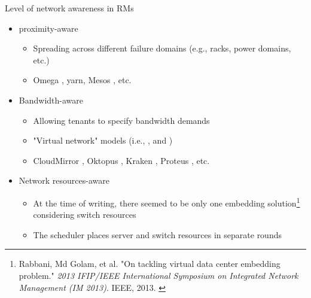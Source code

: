 
\begin{frame}{Level of network awareness in RMs}
    \vspace{2mm}
    \begin{itemize}
        \item {} proximity-aware
        \begin{itemize}
            \item Spreading  across different failure domains (e.g., racks, power domains, etc.)
            \item Omega \cite{omega}, \glsdesc{yarn}, Mesos \cite{mesos}, etc.
        \end{itemize}
        \item Bandwidth-aware
        \begin{itemize}
            \item Allowing tenants to specify bandwidth demands
            \item "Virtual network" models (i.e., ,  and )
            \item CloudMirror \cite{cloudmirror}, Oktopus \cite{oktopus}, Kraken \cite{kraken}, Proteus \cite{proteus}, etc.
        \end{itemize}
        \item Network resources-aware
        \begin{itemize}
            \item At the time of writing, there seemed to be only one embedding solution\footnote{\tiny{Rabbani, Md Golam, et al. "On tackling virtual data center embedding problem." \textit{2013 IFIP/IEEE International Symposium on Integrated Network Management (IM 2013)}. IEEE, 2013. \cite{ontackling}}} considering switch resources
            \item The scheduler places server and switch resources in separate rounds
        \end{itemize}
    \end{itemize}
    \vspace{5mm}
\end{frame}

